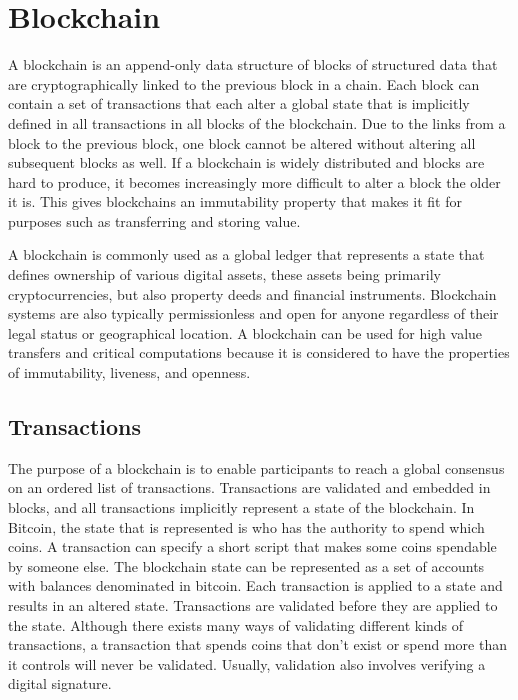 \section{Blockchain}
\label{sec:blockchain}

A blockchain is an append-only data structure of blocks of structured data that are cryptographically linked to the previous block in a chain. Each block can contain a set of transactions that each alter a global state that is implicitly defined in all transactions in all blocks of the blockchain. Due to the links from a block to the previous block, one block cannot be altered without altering all subsequent blocks as well. If a blockchain is widely distributed and blocks are hard to produce, it becomes increasingly more difficult to alter a block the older it is. This gives blockchains an immutability property that makes it fit for purposes such as transferring and storing value.

A blockchain is commonly used as a global ledger that represents a state that defines ownership of various digital assets, these assets being primarily cryptocurrencies, but also property deeds and financial instruments. Blockchain systems are also typically permissionless and open for anyone regardless of their legal status or geographical location. A blockchain can be used for high value transfers and critical computations because it is considered to have the properties of immutability, liveness, and openness. 

\subsection{Transactions}

The purpose of a blockchain is to enable participants to reach a global consensus on an ordered list of transactions. Transactions are validated and embedded in blocks, and all transactions implicitly represent a state of the blockchain. In Bitcoin, the state that is represented is who has the authority to spend which coins. A transaction can specify a short script that makes some coins spendable by someone else.
The blockchain state can be represented as a set of accounts with balances denominated in bitcoin. Each transaction is applied to a state and results in an altered state. Transactions are validated before they are applied to the state. Although there exists many ways of validating different kinds of transactions, a transaction that spends coins that don't exist or spend more than it controls will never be validated. Usually, validation also involves verifying a digital signature.


